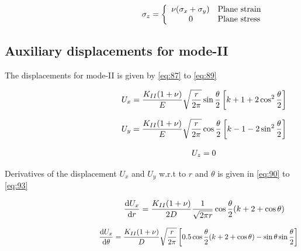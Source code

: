 \documentclass[fleqn, 12.5pt,a4paper]{report}
\newcommand\tab[1][1cm]{\hspace*{#1}}
\begin{document}
\begin{align}\label{eq:86}\hspace{4.5cm}
\sigma_{z} = 
\left\{
\begin{array}{ll}
\nu(\sigma_x + \sigma_y) & \mbox{Plane strain}\\
\tab[0.75cm] 0 & \mbox{Plane stress}\\
\end{array}
\right.
\end{align}

\subsection{Auxiliary displacements for mode-II}
The displacements for mode-II is given by \autoref{eq:87} to \autoref{eq:89} \cite{khoei2014extended}

\begin{align}\label{eq:87}\hspace{4.5cm}
U_x = \frac{K_{II}(1+\nu)}{E} \sqrt{\frac{r}{2\pi}} \sin\frac{\theta}{2} \left[k+1+2\cos^2\frac{\theta}{2} \right]
\end{align}

\begin{align}\label{eq:88}\hspace{4.5cm}
U_y = \frac{K_{II}(1+\nu)}{E} \sqrt{\frac{r}{2\pi}} \cos\frac{\theta}{2} \left[k-1-2\sin^2\frac{\theta}{2} \right]
\end{align}

\begin{align}\label{eq:89}
\hspace{4.5cm}U_z = 0
\end{align}

Derivatives of the displacement $U_x$ and $U_y$ w.r.t to $r$ and $\theta$ \cite{nagashima2003stress} is given in \autoref{eq:90} to \autoref{eq:93}

\begin{align}\label{eq:90}\hspace{4.5cm}
\dv{U_x}{r} = \frac{K_{II}(1+\nu)}{2D} \frac{1}{\sqrt{2\pi r}} \cos\frac{\theta}{2} (k+2+\cos\theta)
\end{align}

\begin{align}\label{eq:91}\hspace{4.5cm}
\dv{U_x}{\theta} = \frac{K_{II}(1+\nu)}{D} \sqrt{\frac{r}{2\pi}} \left[0.5\cos\frac{\theta}{2} (k+2+\cos\theta) - \sin\theta \sin\frac{\theta}{2} \right]
\end{align}
\end{document}
